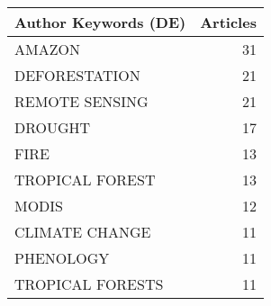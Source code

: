
\begin{tabular}{lr}
\toprule
Author Keywords (DE) & Articles\\
\midrule
AMAZON & 31\\
DEFORESTATION & 21\\
REMOTE SENSING & 21\\
DROUGHT & 17\\
FIRE & 13\\
\addlinespace
TROPICAL FOREST & 13\\
MODIS & 12\\
CLIMATE CHANGE & 11\\
PHENOLOGY & 11\\
TROPICAL FORESTS & 11\\
\bottomrule
\end{tabular}